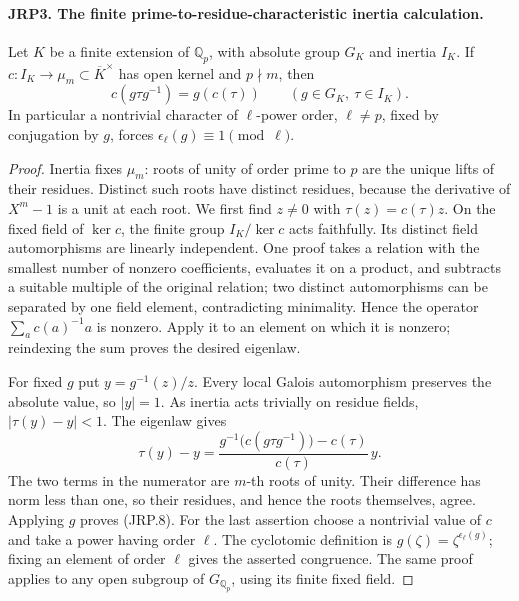 \paragraph{JRP3. The finite prime-to-residue-characteristic inertia calculation.}
\label{claim:JRP3}
Let \(K\) be a finite extension of \(\mathbb Q_p\), with
absolute group \(G_K\) and inertia \(I_K\).  If
\(c:I_K\to\mu_m\subset\overline K^\times\) has open kernel
and \(p\nmid m\), then
\[
 c(g\tau g^{-1})=g(c(\tau))
       \qquad(g\in G_K,\ \tau\in I_K).
 \tag{JRP.8}
\]
In particular a nontrivial character of \(\ell\)-power order,
\(\ell\ne p\), fixed by conjugation by \(g\), forces
\(\epsilon_\ell(g)\equiv1\pmod\ell\).
\begin{proof}
Inertia fixes \(\mu_m\): roots of unity of order prime to \(p\)
are the unique lifts of their residues.  Distinct such roots have
distinct residues, because the derivative of \(X^m-1\) is a unit
at each root.  We first find \(z\ne0\) with
\(\tau(z)=c(\tau)z\).  On the fixed field of \(\ker c\),
the finite group \(I_K/\ker c\) acts faithfully.  Its distinct
field automorphisms are linearly independent.  One proof takes a
relation with the smallest number of nonzero coefficients,
evaluates it on a product, and subtracts a suitable multiple of the
original relation; two distinct automorphisms can be separated by
one field element, contradicting minimality.  Hence the operator
\(\sum_a c(a)^{-1}a\) is nonzero.  Apply it to an element on
which it is nonzero; reindexing the sum proves the desired eigenlaw.

For fixed \(g\) put \(y=g^{-1}(z)/z\).  Every local Galois
automorphism preserves the absolute value, so \(|y|=1\).
As inertia acts trivially on residue fields,
\(|\tau(y)-y|<1\).  The eigenlaw gives
\[
 \tau(y)-y=
 \frac{g^{-1}\bigl(c(g\tau g^{-1})\bigr)-c(\tau)}{c(\tau)}\,y.
\]
The two terms in the numerator are \(m\)-th roots of unity.
Their difference has norm less than one, so their residues, and
hence the roots themselves, agree.  Applying \(g\) proves
(JRP.8).  For the last assertion choose a nontrivial value of
\(c\) and take a power having order \(\ell\).
The cyclotomic definition is
\(g(\zeta)=\zeta^{\epsilon_\ell(g)}\); fixing an element of
order \(\ell\) gives the asserted congruence.  The same proof
applies to any open subgroup of \(G_{\mathbb Q_p}\), using its
finite fixed field.
\end{proof}

